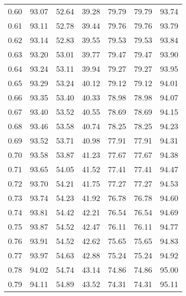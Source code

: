 \begin{tabular}{|c|c|c|c|c|c|c|}
      0.60 &     93.07 &     52.64 &      39.28 &   79.79 &      79.79 &         93.74 \\
      0.61 &     93.11 &     52.78 &      39.44 &   79.76 &      79.76 &         93.79 \\
      0.62 &     93.14 &     52.83 &      39.55 &   79.53 &      79.53 &         93.84 \\
      0.63 &     93.20 &     53.01 &      39.77 &   79.47 &      79.47 &         93.90 \\
      0.64 &     93.24 &     53.11 &      39.94 &   79.27 &      79.27 &         93.95 \\
      0.65 &     93.29 &     53.24 &      40.12 &   79.12 &      79.12 &         94.01 \\
      0.66 &     93.35 &     53.40 &      40.33 &   78.98 &      78.98 &         94.07 \\
      0.67 &     93.40 &     53.52 &      40.55 &   78.69 &      78.69 &         94.15 \\
      0.68 &     93.46 &     53.58 &      40.74 &   78.25 &      78.25 &         94.23 \\
      0.69 &     93.52 &     53.71 &      40.98 &   77.91 &      77.91 &         94.31 \\
      0.70 &     93.58 &     53.87 &      41.23 &   77.67 &      77.67 &         94.38 \\
      0.71 &     93.65 &     54.05 &      41.52 &   77.41 &      77.41 &         94.47 \\
      0.72 &     93.70 &     54.21 &      41.75 &   77.27 &      77.27 &         94.53 \\
      0.73 &     93.74 &     54.23 &      41.92 &   76.78 &      76.78 &         94.60 \\
      0.74 &     93.81 &     54.42 &      42.21 &   76.54 &      76.54 &         94.69 \\
      0.75 &     93.87 &     54.52 &      42.47 &   76.11 &      76.11 &         94.77 \\
      0.76 &     93.91 &     54.52 &      42.62 &   75.65 &      75.65 &         94.83 \\
      0.77 &     93.97 &     54.63 &      42.88 &   75.24 &      75.24 &         94.92 \\
      0.78 &     94.02 &     54.74 &      43.14 &   74.86 &      74.86 &         95.00 \\
      0.79 &     94.11 &     54.89 &      43.52 &   74.31 &      74.31 &         95.11 \\

\end{tabular}
